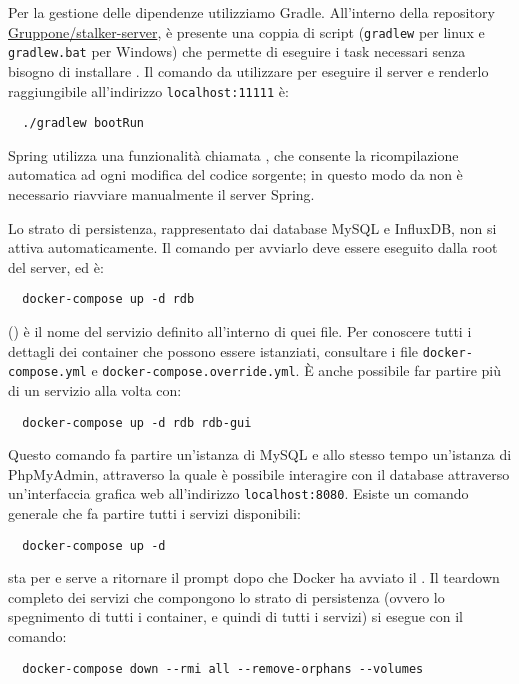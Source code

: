 \documentclass[../../manuale-manutentore.tex]{subfiles}
\begin{document}
Per la gestione delle dipendenze utilizziamo Gradle.
All'interno della repository \href{Gruppone/stalker-server}{Gruppone/stalker-server}, è presente una coppia di script (\texttt{gradlew} per linux e \texttt{gradlew.bat} per Windows) che permette di eseguire i task necessari senza bisogno di installare .
Il comando da utilizzare per eseguire il server e renderlo raggiungibile all'indirizzo \texttt{localhost:11111} è:

\begin{verbatim}
  ./gradlew bootRun
\end{verbatim}

Spring utilizza una funzionalità chiamata , che consente la ricompilazione automatica ad ogni modifica del codice sorgente; in questo modo da non è necessario riavviare manualmente il server Spring.\par
Lo strato di persistenza, rappresentato dai database MySQL e InfluxDB, non si attiva automaticamente.
Il comando per avviarlo deve essere eseguito dalla root del server, ed è:

\begin{verbatim}
  docker-compose up -d rdb
\end{verbatim}

 () è il nome del servizio definito all'interno di quei file.
Per conoscere tutti i dettagli dei container che possono essere istanziati, consultare i file \texttt{docker-compose.yml} e \texttt{docker-compose.override.yml}.
È anche possibile far partire più di un servizio alla volta con:

\begin{verbatim}
  docker-compose up -d rdb rdb-gui
\end{verbatim}

Questo comando fa partire un'istanza di MySQL e allo stesso tempo un'istanza di PhpMyAdmin, attraverso la quale è possibile interagire con il database attraverso un'interfaccia grafica web all'indirizzo \texttt{localhost:8080}.
Esiste un comando generale che fa partire tutti i servizi disponibili:

\begin{verbatim}
  docker-compose up -d
\end{verbatim}

 sta per  e serve a ritornare il prompt dopo che Docker ha avviato il .
Il teardown completo dei servizi che compongono lo strato di persistenza (ovvero lo spegnimento di tutti i container, e quindi di tutti i servizi) si esegue con il comando:

\begin{verbatim}
  docker-compose down --rmi all --remove-orphans --volumes
\end{verbatim}
\end{document}
